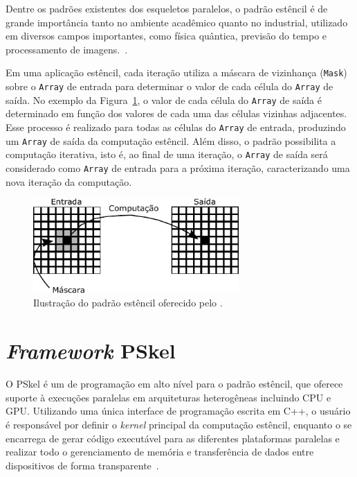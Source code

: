 Dentre os padrões existentes dos esqueletos paralelos, o padrão estêncil é de grande importância tanto no ambiente acadêmico quanto no industrial, utilizado em diversos campos importantes, como física quântica, previsão do tempo e processamento de imagens.~\cite{pereira15}.

Em uma aplicação estêncil, cada iteração utiliza a máscara de vizinhança (\texttt{Mask}) sobre o \texttt{Array} de entrada para determinar o valor de cada célula do \texttt{Array} de saída. No exemplo da Figura~\ref{fig:stencil}, o valor de cada célula do \texttt{Array} de saída é determinado em função dos valores de cada uma das células vizinhas adjacentes. Esse processo é realizado para todas as células do \texttt{Array} de entrada, produzindo um \texttt{Array} de saída da computação estêncil. Além disso, o padrão possibilita a computação iterativa, isto é, ao final de uma iteração, o \texttt{Array} de saída será considerado como \texttt{Array} de entrada para a próxima iteração, caracterizando uma nova iteração da computação.

\begin{figure}[t]
	\centering
	\includegraphics[width=0.7\textwidth]{figs/stencilComp.pdf}
	\caption{Ilustração do padrão estêncil oferecido pelo \pskel.}
	\label{fig:stencil}
\end{figure}



\section{\textit{Framework} PSkel}
O PSkel é um \fw de programação em alto nível para o padrão estêncil, que oferece suporte à execuções paralelas em arquiteturas heterogêneas incluindo CPU e GPU. Utilizando uma única interface de programação escrita em C++, o usuário é responsável por definir o \textit{kernel} principal da computação estêncil, enquanto o \fw se encarrega de gerar código executável para as diferentes plataformas paralelas e realizar todo o gerenciamento de memória e transferência de dados entre dispositivos de forma transparente~\cite{pereira15}.

